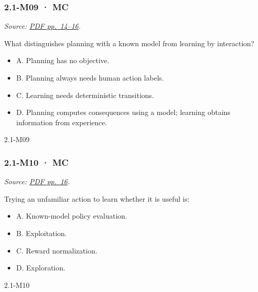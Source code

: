 \noindent\begin{minipage}{\linewidth}

\subsubsection{2.1-M09 · MC}\label{m09-mc-3}

\emph{Source:
\href{../Lecture\%20Slides/2.1.\%20Introduction\%20to\%20Reinforcement\%20Learning.pdf\#page=14}{PDF
pp.~14--16}.}

What distinguishes planning with a known model from learning by
interaction?

\begin{itemize}
\tightlist
\item
  A. Planning has no objective.
\item
  B. Planning always needs human action labels.
\item
  C. Learning needs deterministic transitions.
\item
  D. Planning computes consequences using a model; learning obtains
  information from experience.
\end{itemize}

\begin{solution}[8mm]{2.1-M09}

\end{solution}
\end{minipage}\par\medskip

\noindent\begin{minipage}{\linewidth}

\subsubsection{2.1-M10 · MC}\label{m10-mc-3}

\emph{Source:
\href{../Lecture\%20Slides/2.1.\%20Introduction\%20to\%20Reinforcement\%20Learning.pdf\#page=16}{PDF
pp.~16}.}

Trying an unfamiliar action to learn whether it is useful is:

\begin{itemize}
\tightlist
\item
  A. Known-model policy evaluation.
\item
  B. Exploitation.
\item
  C. Reward normalization.
\item
  D. Exploration.
\end{itemize}

\begin{solution}[8mm]{2.1-M10}

\end{solution}
\end{minipage}\par\medskip

